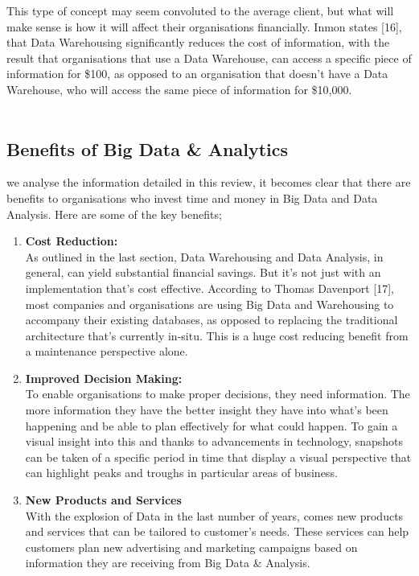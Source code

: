\documentclass[10pt,journal,compsoc]{IEEEtran}
\begin{document}
This type of concept may seem convoluted to the average client, but what will make sense is how it will affect their organisations financially. Inmon states [16], that Data Warehousing significantly reduces the cost of information, with the result that organisations that use a Data Warehouse, can access a specific piece of information for \$100, as opposed to an organisation that doesn't have a Data Warehouse, who will access the same piece of information for \$10,000.\\\\ 

\subsection{Benefits of Big Data \& Analytics}
 we analyse the information detailed in this review, it becomes clear that there are benefits to organisations who invest time and money in Big Data and Data Analysis. Here are some of the key benefits;

\begin{enumerate}
	\item \textbf{Cost Reduction:}\\ As outlined in the last section, Data Warehousing and Data Analysis, in general, can yield substantial financial savings. But it's not just with an implementation that's cost effective. According to Thomas Davenport [17], most companies and organisations are using Big Data and Warehousing to accompany their existing databases, as opposed to replacing the traditional architecture that's currently in-situ. This is a huge cost reducing benefit from a maintenance perspective alone. \\
	
	\item \textbf{Improved Decision Making:}\\ To enable organisations to make proper decisions, they need information. The more information they have the better insight they have into what's been happening and be able to plan effectively for what could happen. To gain a visual insight into this and thanks to advancements in technology, snapshots can be taken of a specific period in time that display a visual perspective that can highlight peaks and troughs in particular areas of business. \\
	
	\item \textbf{New Products and Services}\\With the explosion of Data in the last number of years, comes new products and services that can be tailored to customer’s needs. These services can help customers plan new advertising and marketing campaigns based on information they are receiving from Big Data \& Analysis. 
	 
\end{enumerate}
\end{document}
